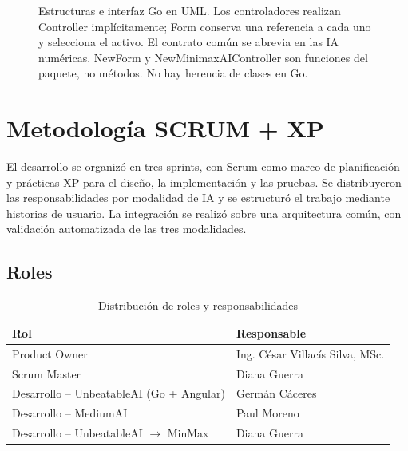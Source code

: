 \documentclass[12pt,a4paper]{article}
\begin{document}
\begin{figure}[H]
{}
\caption{Estructuras e interfaz Go en UML. Los controladores realizan Controller
implícitamente; Form conserva una referencia a cada uno y selecciona el activo.
El contrato común se abrevia en las IA numéricas. NewForm y NewMinimaxAIController
son funciones del paquete, no métodos. No hay herencia de clases en Go.}
\label{fig:uml-clases}
\end{figure}

\section{Metodología SCRUM + XP}
El desarrollo se organizó en tres sprints, con Scrum como marco de planificación
y prácticas XP para el diseño, la implementación y las pruebas. Se distribuyeron
las responsabilidades por modalidad de IA y se estructuró el trabajo mediante
historias de usuario. La integración se realizó sobre una arquitectura común,
con validación automatizada de las tres modalidades.

\subsection{Roles}
\begin{table}[H]
\centering
\caption{Distribución de roles y responsabilidades}
\begin{tabular}{ll}
\toprule
\textbf{Rol} & \textbf{Responsable}\\
\midrule
Product Owner & Ing. César Villacís Silva, MSc.\\
Scrum Master & Diana Guerra\\
Desarrollo -- UnbeatableAI (Go + Angular) & Germán Cáceres\\
Desarrollo -- MediumAI & Paul Moreno\\
Desarrollo -- UnbeatableAI $\rightarrow$ MinMax & Diana Guerra\\
\bottomrule
\end{tabular}
\end{table}
\end{document}
